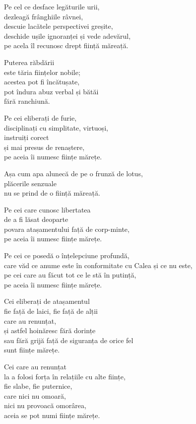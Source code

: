 Pe cel ce desface legăturile urii,\\
dezleagă frânghiile râvnei,\\
descuie lacătele perspectivei greșite,\\
deschide ușile ignoranței și vede adevărul,\\
pe acela îl recunosc drept ființă măreață.


Puterea răbdării\\
este tăria ființelor nobile;\\
acestea pot fi încătușate,\\
pot îndura abuz verbal și bătăi\\
fără ranchiună.

Pe cei eliberați de furie,\\
disciplinați cu simplitate, virtuoși,\\
instruiți corect\\
și mai presus de renaștere,\\
pe aceia îi numesc ființe mărețe.


Așa cum apa alunecă de pe o frunză de lotus,\\
plăcerile senzuale\\
nu se prind de o ființă măreață.


Pe cei care cunosc libertatea\\
de a fi lăsat deoparte\\
povara atașamentului față de corp-minte,\\
pe aceia îi numesc ființe mărețe.


Pe cei ce posedă o înțelepciune profundă,\\
care văd ce anume este în conformitate cu Calea și ce nu este,\\
pe cei care au făcut tot ce le stă în putință,\\
pe aceia îi numesc ființe mărețe.


Cei eliberați de atașamentul\\
fie față de laici, fie față de alții\\
care au renunțat,\\
și astfel hoinăresc fără dorințe\\
sau fără grijă față de siguranța de orice fel\\
sunt ființe mărețe.


Cei care au renunțat\\
la a folosi forța în relațiile cu alte ființe,\\
fie slabe, fie puternice,\\
care nici nu omoară,\\
nici nu provoacă omorârea,\\
aceia se pot numi ființe mărețe.


